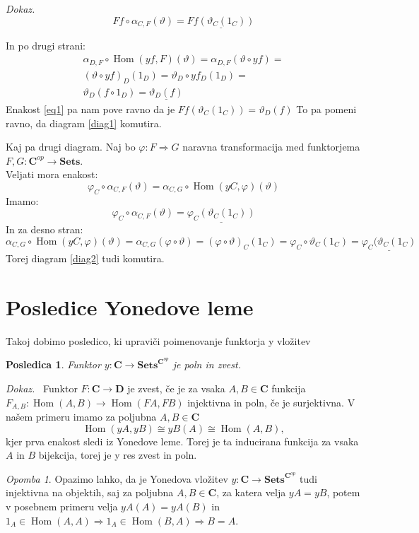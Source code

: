\documentclass[12pt,a4paper]{book}
\theoremstyle{definition}
\theoremstyle{plain}
\newtheorem{posledica}{Posledica}
\newenvironment{dokaz}{\emph{Dokaz.}\ }{\hspace{\fill}{$\Box$}}
\theoremstyle{definition}
\theoremstyle{remark}
\newtheorem*{opomba}{Opomba}
\newcommand{\cat}[1]{\textbf{#1}}
\DeclareMathOperator{\Hom}{Hom}
\begin{document}
\begin{dokaz}
$$Ff \circ \alpha_{C,F}(\vartheta) = \underline{Ff(\vartheta_C(1_C))}$$

In po drugi strani:
\begin{align*}
\alpha_{D,F} \circ \Hom(yf,F)(\vartheta) = \alpha_{D,F}(\vartheta \circ yf) = \\
(\vartheta \circ yf)_D (1_D) = \vartheta_D \circ yf_D(1_D) = \\
\vartheta_D(f \circ 1_D) = \underline{\vartheta_D(f)}
\end{align*}
Enakost \ref{eq1} pa nam pove ravno da je $Ff(\vartheta_C(1_C)) = \vartheta_D(f)$
To pa pomeni ravno, da diagram \ref{diag1} komutira.

Kaj pa drugi diagram. Naj bo $\varphi : F \Rightarrow G$ naravna transformacija med funktorjema $F,G : \cat{C}^{op} \to \cat{Sets}$. \\
Veljati mora enakost:
$$\varphi_C \circ \alpha_{C,F}(\vartheta) = \alpha_{C,G} \circ \Hom(yC,\varphi)(\vartheta)$$
Imamo:
$$\varphi_C \circ \alpha_{C,F}(\vartheta) = \underline{\varphi_C(\vartheta_C(1_C))}$$
In za desno stran:
$$\alpha_{C,G} \circ \Hom(yC,\varphi)(\vartheta) = \alpha_{C,G}(\varphi \circ \vartheta) = 
(\varphi \circ \vartheta)_C(1_C) = \varphi_C \circ \vartheta_C(1_C) = \underline{\varphi_C(\vartheta_C(1_C)}$$
Torej diagram \ref{diag2} tudi komutira.

\end{dokaz}

\section{Posledice Yonedove leme}

Takoj dobimo posledico, ki upraviči poimenovanje funktorja y vložitev
\begin{posledica} Funktor $y : \cat{C} \to \cat{Sets}^{\cat{C}^{op}}$ je poln in zvest.
\end{posledica}
\begin{dokaz}
Funktor $F:\cat{C} \to \cat{D}$ je zvest, če je za vsaka $A,B \in \cat{C}$ funkcija $F_{A,B} : \Hom(A,B) \to \Hom(FA,FB)$ injektivna in poln, če je surjektivna.
V našem primeru imamo za poljubna $A,B \in \cat{C}$ 
$$\Hom(yA,yB) \cong yB(A) \cong \Hom(A,B),$$
kjer prva enakost sledi iz Yonedove leme. Torej je ta inducirana funkcija za vsaka $A$ in $B$ bijekcija, torej je y res zvest in poln.
\end{dokaz}
\begin{opomba}
Opazimo lahko, da je Yonedova vložitev $y : \cat{C} \to \cat{Sets}^{\cat{C}^{op}}$ tudi injektivna na objektih, saj za poljubna $A,B \in \cat{C}$, za katera velja $yA = yB$, potem v posebnem primeru velja $yA(A) = yA(B)$ in $1_A \in \Hom(A,A) \Rightarrow 1_A \in \Hom(B,A) \Rightarrow B = A$.
\end{opomba}
\end{document}
